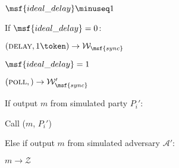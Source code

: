 
\begin{bbox}[title={Algorithm $\msf{Poll}$}]

\begin{renumerate}

  	\item $\msf{ideal\_delay} \minuseq 1$
  	
  	\item If $\msf{ideal\_delay} = 0$:
  	 
  		\quad \Send $(\textsc{delay}, 1 \token) \rightarrow \mathcal{W}_\msf{sync}$

  		\quad $\msf{ideal\_delay} = 1$

  	\item \Send $(\textsc{poll},) \rightarrow \mathcal{W}_\msf{sync}'$
 
  	\item If output $m$ from simulated party $P_i'$:


			\quad Call ($m$, $P_i'$)
		
		Else if output $m$ from simulated adversary $\mathcal{A}'$:

			\quad \Send $m \rightarrow \mathcal{Z}$

\end{renumerate}

\end{bbox}
